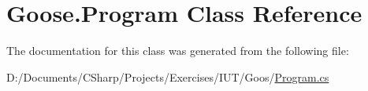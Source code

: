 \hypertarget{class_goose_1_1_program}{}\section{Goose.\+Program Class Reference}
\label{class_goose_1_1_program}


The documentation for this class was generated from the following file\+:\begin{DoxyCompactItemize}
\item 
D\+:/\+Documents/\+C\+Sharp/\+Projects/\+Exercises/\+I\+U\+T/\+Goos/\hyperlink{_program_8cs}{Program.\+cs}\end{DoxyCompactItemize}
